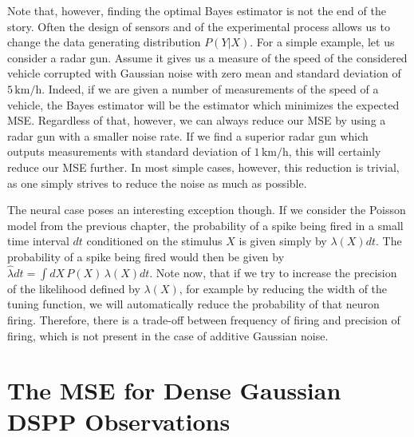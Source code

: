 Note that, however, finding the optimal Bayes estimator is not the end of the story. Often the design of sensors and of the experimental process allows us to change the data generating distribution $P(Y|X)$. For a simple example, let us consider a radar gun. Assume it gives us a measure of the speed of the considered vehicle corrupted  with Gaussian noise with zero mean and standard deviation of $5\,\textrm{km/h}$. Indeed, if we are given a number of measurements of the speed of a vehicle, the Bayes estimator will be the estimator which minimizes the expected MSE. Regardless of that, however, we can always reduce our MSE by using a radar gun with a smaller noise rate. If we find a superior radar gun which outputs measurements with standard deviation of $1\,\textrm{km/h}$, this will certainly reduce our MSE further. In most simple cases, however, this reduction is trivial, as one simply strives to reduce the noise as much as possible.\par
The neural case poses an interesting exception though. If we consider the Poisson model from the previous chapter, the probability of a spike being fired in a small time interval $dt$ conditioned on the stimulus $X$ is given simply by $\lambda(X)dt$. The probability of a spike being fired would then be given by $\hat{\lambda}dt = \int dX\, P(X)\, \lambda(X)dt$. Note now, that if we try to increase the precision of the likelihood defined by $\lambda(X)$, for example by reducing the width of the tuning function, we will automatically reduce the probability of that neuron firing. Therefore, there is a trade-off between frequency of firing and precision of firing, which is not present in the case of additive Gaussian noise.

\section{The MSE for Dense Gaussian DSPP Observations}

